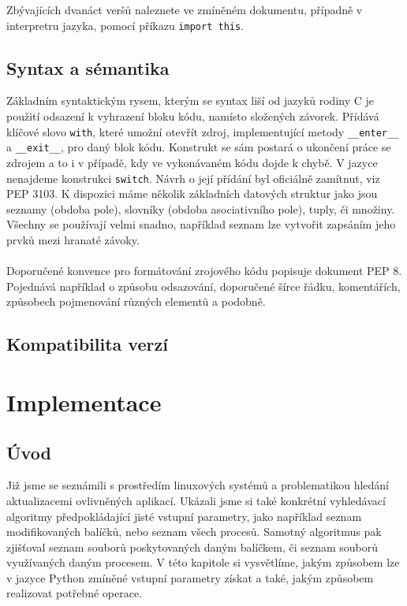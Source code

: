 \documentclass[
  field=inf,
  biblatex,
  glossaries,
  index
]{kidiplom}
\begin{document}
	Zbývajících dvanáct veršů naleznete ve zmíněném dokumentu, případně v interpretru jazyka, pomocí příkazu \texttt{import this}.

	\subsection{Syntax a sémantika}
	Základním syntaktickým rysem, kterým se syntax liší od jazyků rodiny C je použití odsazení k vyhrazení bloku kódu, namísto složených závorek. Přídává klíčové slovo \texttt{with}, které umožní otevřít zdroj, implementující metody \texttt{\_\_enter\_\_} a \texttt{\_\_exit\_\_}, pro daný blok kódu. Konstrukt se sám postará o ukončení práce se zdrojem a to i v případě, kdy ve vykonávaném kódu dojde k chybě. V jazyce nenajdeme konstrukci \texttt{switch}. Návrh o její přídání byl oficiálně zamítnut, viz PEP 3103. K dispozici máme několik základních datových struktur jako jsou seznamy (obdoba pole), slovníky (obdoba asociativního pole), tuply, či množiny. Všechny se používají velmi snadno, například seznam lze vytvořit zapsáním jeho prvků mezi hranaté závoky.
	\\
	\\
	Doporučené konvence pro formátování zrojového kódu popisuje dokument PEP 8. Pojednává například o způsobu odsazování, doporučené šírce řádku, komentářích, způsobech pojmenování různých elementů a podobně.


	\subsection{Kompatibilita verzí}

\newpage
\section{Implementace}
	\subsection{Úvod}
	Již jsme se seznámili s prostředím linuxových systémů a problematikou hledání aktualizacemi ovlivněných aplikací. Ukázali jsme si také konkrétní vyhledávací algoritmy předpokládající jisté vstupní parametry, jako například seznam modifikovaných balíčků, nebo seznam všech procesů. Samotný algoritmus pak zjišťoval seznam souborů poskytovaných daným balíčkem, či seznam souborů využívaných daným procesem. V této kapitole si vysvětlíme, jakým způsobem lze v jazyce Python zmíněné vstupní parametry získat a také, jakým způsobem realizovat potřebné operace.
\end{document}
